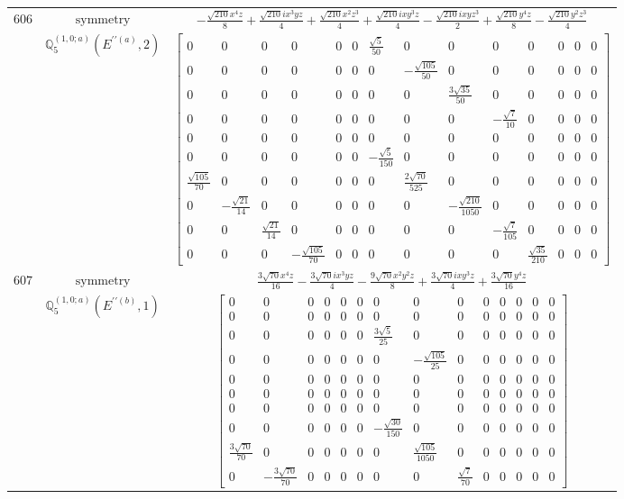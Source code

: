 \documentclass[fleqn,8pt,landscape]{jsarticle}
\begin{document}
\begin{longtable}{ccc}
$ 606 $ & $ \text{symmetry} $ & $ - \frac{\sqrt{210} x^{4} z}{8} + \frac{\sqrt{210} i x^{3} y z}{4} + \frac{\sqrt{210} x^{2} z^{3}}{4} + \frac{\sqrt{210} i x y^{3} z}{4} - \frac{\sqrt{210} i x y z^{3}}{2} + \frac{\sqrt{210} y^{4} z}{8} - \frac{\sqrt{210} y^{2} z^{3}}{4} $ \\
$  $ & $ \mathbb{Q}_{5}^{(1,0;a)}(E^{\prime\prime(a)},2) $ & $ \begin{bmatrix} 0 & 0 & 0 & 0 & 0 & 0 & \frac{\sqrt{5}}{50} & 0 & 0 & 0 & 0 & 0 & 0 & 0 \\ 0 & 0 & 0 & 0 & 0 & 0 & 0 & - \frac{\sqrt{105}}{50} & 0 & 0 & 0 & 0 & 0 & 0 \\ 0 & 0 & 0 & 0 & 0 & 0 & 0 & 0 & \frac{3 \sqrt{35}}{50} & 0 & 0 & 0 & 0 & 0 \\ 0 & 0 & 0 & 0 & 0 & 0 & 0 & 0 & 0 & - \frac{\sqrt{7}}{10} & 0 & 0 & 0 & 0 \\ 0 & 0 & 0 & 0 & 0 & 0 & 0 & 0 & 0 & 0 & 0 & 0 & 0 & 0 \\ 0 & 0 & 0 & 0 & 0 & 0 & - \frac{\sqrt{5}}{150} & 0 & 0 & 0 & 0 & 0 & 0 & 0 \\ \frac{\sqrt{105}}{70} & 0 & 0 & 0 & 0 & 0 & 0 & \frac{2 \sqrt{70}}{525} & 0 & 0 & 0 & 0 & 0 & 0 \\ 0 & - \frac{\sqrt{21}}{14} & 0 & 0 & 0 & 0 & 0 & 0 & - \frac{\sqrt{210}}{1050} & 0 & 0 & 0 & 0 & 0 \\ 0 & 0 & \frac{\sqrt{21}}{14} & 0 & 0 & 0 & 0 & 0 & 0 & - \frac{\sqrt{7}}{105} & 0 & 0 & 0 & 0 \\ 0 & 0 & 0 & - \frac{\sqrt{105}}{70} & 0 & 0 & 0 & 0 & 0 & 0 & \frac{\sqrt{35}}{210} & 0 & 0 & 0 \end{bmatrix} $ \\ \hline
$ 607 $ & $ \text{symmetry} $ & $ \frac{3 \sqrt{70} x^{4} z}{16} - \frac{3 \sqrt{70} i x^{3} y z}{4} - \frac{9 \sqrt{70} x^{2} y^{2} z}{8} + \frac{3 \sqrt{70} i x y^{3} z}{4} + \frac{3 \sqrt{70} y^{4} z}{16} $ \\
$  $ & $ \mathbb{Q}_{5}^{(1,0;a)}(E^{\prime\prime(b)},1) $ & $ \begin{bmatrix} 0 & 0 & 0 & 0 & 0 & 0 & 0 & 0 & 0 & 0 & 0 & 0 & 0 & 0 \\ 0 & 0 & 0 & 0 & 0 & 0 & 0 & 0 & 0 & 0 & 0 & 0 & 0 & 0 \\ 0 & 0 & 0 & 0 & 0 & 0 & \frac{3 \sqrt{5}}{25} & 0 & 0 & 0 & 0 & 0 & 0 & 0 \\ 0 & 0 & 0 & 0 & 0 & 0 & 0 & - \frac{\sqrt{105}}{25} & 0 & 0 & 0 & 0 & 0 & 0 \\ 0 & 0 & 0 & 0 & 0 & 0 & 0 & 0 & 0 & 0 & 0 & 0 & 0 & 0 \\ 0 & 0 & 0 & 0 & 0 & 0 & 0 & 0 & 0 & 0 & 0 & 0 & 0 & 0 \\ 0 & 0 & 0 & 0 & 0 & 0 & 0 & 0 & 0 & 0 & 0 & 0 & 0 & 0 \\ 0 & 0 & 0 & 0 & 0 & 0 & - \frac{\sqrt{30}}{150} & 0 & 0 & 0 & 0 & 0 & 0 & 0 \\ \frac{3 \sqrt{70}}{70} & 0 & 0 & 0 & 0 & 0 & 0 & \frac{\sqrt{105}}{1050} & 0 & 0 & 0 & 0 & 0 & 0 \\ 0 & - \frac{3 \sqrt{70}}{70} & 0 & 0 & 0 & 0 & 0 & 0 & \frac{\sqrt{7}}{70} & 0 & 0 & 0 & 0 & 0 \end{bmatrix} $ \\ \hline

\end{longtable}
\end{document}
